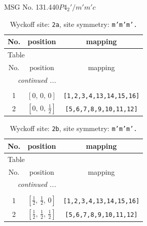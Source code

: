\documentclass[fleqn,8pt]{jsarticle}
\begin{document}
\setcounter{MaxMatrixCols}{32}

\renewcommand{\tablename}{Table~}
\renewcommand{\figurename}{Figure~}
\begin{center}
\LARGE
MSG No. 131.440\quad$P4_{2}'/m'm'c$
\end{center}
\renewcommand{\arraystretch}{1.2}
\begin{longtable}{ccc}
\caption{Wyckoff site: {\tt 2a}, site symmetry: {\tt m'm'm'.}}
 \\
 \hline \hline
No. & position & mapping \\ \hline \endfirsthead

\multicolumn{2}{l}{\tablename\ \thetable{}} \\
 \hline \hline
No. & position & mapping \\ \hline \endhead

 \hline \hline
\multicolumn{2}{r}{\footnotesize\it continued ...} \\ \endfoot

 \hline \hline
\multicolumn{2}{r}{} \\ \endlastfoot

1 & $\left[ 0,\, 0,\, 0 \right]$ & {\tt [1,2,3,4,13,14,15,16]} \\ \hline
2 & $\left[ 0,\, 0,\, \frac{1}{2} \right]$ & {\tt [5,6,7,8,9,10,11,12]} \\
\end{longtable}
\renewcommand{\arraystretch}{1.2}
\begin{longtable}{ccc}
\caption{Wyckoff site: {\tt 2b}, site symmetry: {\tt m'm'm'.}}
 \\
 \hline \hline
No. & position & mapping \\ \hline \endfirsthead

\multicolumn{2}{l}{\tablename\ \thetable{}} \\
 \hline \hline
No. & position & mapping \\ \hline \endhead

 \hline \hline
\multicolumn{2}{r}{\footnotesize\it continued ...} \\ \endfoot

 \hline \hline
\multicolumn{2}{r}{} \\ \endlastfoot

1 & $\left[ \frac{1}{2},\, \frac{1}{2},\, 0 \right]$ & {\tt [1,2,3,4,13,14,15,16]} \\ \hline
2 & $\left[ \frac{1}{2},\, \frac{1}{2},\, \frac{1}{2} \right]$ & {\tt [5,6,7,8,9,10,11,12]} \\
\end{longtable}
\end{document}
